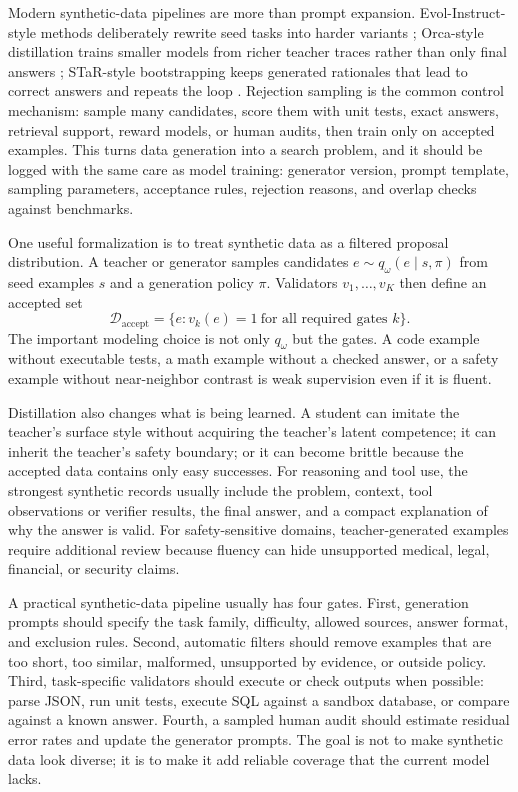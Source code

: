 Modern synthetic-data pipelines are more than prompt expansion. Evol-Instruct-style methods deliberately rewrite seed tasks into harder variants \cite{xu2023wizardlm}; Orca-style distillation trains smaller models from richer teacher traces rather than only final answers \cite{mukherjee2023orca}; STaR-style bootstrapping keeps generated rationales that lead to correct answers and repeats the loop \cite{zelikman2022star}. Rejection sampling is the common control mechanism: sample many candidates, score them with unit tests, exact answers, retrieval support, reward models, or human audits, then train only on accepted examples. This turns data generation into a search problem, and it should be logged with the same care as model training: generator version, prompt template, sampling parameters, acceptance rules, rejection reasons, and overlap checks against benchmarks.

One useful formalization is to treat synthetic data as a filtered proposal distribution. A teacher or generator samples candidates $e\sim q_\omega(e\mid s,\pi)$ from seed examples $s$ and a generation policy $\pi$. Validators $v_1,\ldots,v_K$ then define an accepted set
\[
  \mathcal{D}_{\mathrm{accept}}
  =
  \{e : v_k(e)=1 \ \text{for all required gates } k\}.
\]
The important modeling choice is not only $q_\omega$ but the gates. A code example without executable tests, a math example without a checked answer, or a safety example without near-neighbor contrast is weak supervision even if it is fluent.

Distillation also changes what is being learned. A student can imitate the teacher's surface style without acquiring the teacher's latent competence; it can inherit the teacher's safety boundary; or it can become brittle because the accepted data contains only easy successes. For reasoning and tool use, the strongest synthetic records usually include the problem, context, tool observations or verifier results, the final answer, and a compact explanation of why the answer is valid. For safety-sensitive domains, teacher-generated examples require additional review because fluency can hide unsupported medical, legal, financial, or security claims.

A practical synthetic-data pipeline usually has four gates. First, generation prompts should specify the task family, difficulty, allowed sources, answer format, and exclusion rules. Second, automatic filters should remove examples that are too short, too similar, malformed, unsupported by evidence, or outside policy. Third, task-specific validators should execute or check outputs when possible: parse JSON, run unit tests, execute SQL against a sandbox database, or compare against a known answer. Fourth, a sampled human audit should estimate residual error rates and update the generator prompts. The goal is not to make synthetic data look diverse; it is to make it add reliable coverage that the current model lacks.

